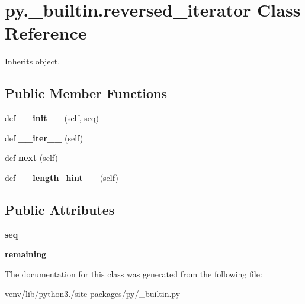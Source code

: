 \hypertarget{classpy_1_1__builtin_1_1reversed__iterator}{}\section{py.\+\_\+builtin.\+reversed\+\_\+iterator Class Reference}
\label{classpy_1_1__builtin_1_1reversed__iterator}


Inherits object.

\subsection*{Public Member Functions}
\begin{DoxyCompactItemize}
\item 
\mbox{\label{classpy_1_1__builtin_1_1reversed__iterator_afb30958f4fdca022b44b58e6c1f6d966}} 
def {\bfseries \+\_\+\+\_\+init\+\_\+\+\_\+} (self, seq)
\item 
\mbox{\label{classpy_1_1__builtin_1_1reversed__iterator_aee9ede57ca765a98212a120517eb0add}} 
def {\bfseries \+\_\+\+\_\+iter\+\_\+\+\_\+} (self)
\item 
\mbox{\label{classpy_1_1__builtin_1_1reversed__iterator_a5d2126472f807e7f2268162aeec74357}} 
def {\bfseries next} (self)
\item 
\mbox{\label{classpy_1_1__builtin_1_1reversed__iterator_a58b5efa84ef4986e93dd3ddb72b1e369}} 
def {\bfseries \+\_\+\+\_\+length\+\_\+hint\+\_\+\+\_\+} (self)
\end{DoxyCompactItemize}
\subsection*{Public Attributes}
\begin{DoxyCompactItemize}
\item 
\mbox{\label{classpy_1_1__builtin_1_1reversed__iterator_a662b5bb279ba301516bf01c9909cf314}} 
{\bfseries seq}
\item 
\mbox{\label{classpy_1_1__builtin_1_1reversed__iterator_a9c7e806c7b5d20d43654e17258ed6b54}} 
{\bfseries remaining}
\end{DoxyCompactItemize}


The documentation for this class was generated from the following file\+:\begin{DoxyCompactItemize}
\item 
venv/lib/python3./site-\/packages/py/\+\_\+builtin.\+py\end{DoxyCompactItemize}
